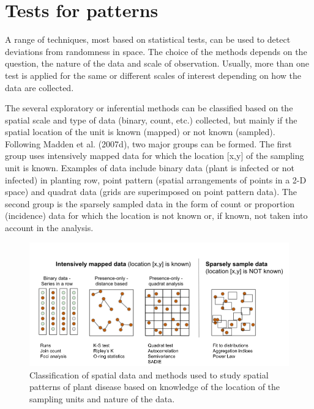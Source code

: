 \documentclass[
  letterpaper,
]{book}
\begin{document}
\hypertarget{tests-for-patterns}{%
\chapter{Tests for patterns}\label{tests-for-patterns}}

A range of techniques, most based on statistical tests, can be used to
detect deviations from randomness in space. The choice of the methods
depends on the question, the nature of the data and scale of
observation. Usually, more than one test is applied for the same or
different scales of interest depending on how the data are collected.

The several exploratory or inferential methods can be classified based
on the spatial scale and type of data (binary, count, etc.) collected,
but mainly if the spatial location of the unit is known (mapped) or not
known (sampled). Following Madden et al. (2007d), two major groups can
be formed. The first group uses intensively mapped data for which the
location {[}x,y{]} of the sampling unit is known. Examples of data
include binary data (plant is infected or not infected) in planting row,
point pattern (spatial arrangements of points in a 2-D space) and
quadrat data (grids are superimposed on point pattern data). The second
group is the sparsely sampled data in the form of count or proportion
(incidence) data for which the location is not known or, if known, not
taken into account in the analysis.

\begin{figure}

{\centering \includegraphics[width=6.76042in,height=\textheight]{imgs/spatial_methods2.png}

}

\caption{\label{fig-spatialmethods}Classification of spatial data and
methods used to study spatial patterns of plant disease based on
knowledge of the location of the sampling units and nature of the data.}

\end{figure}
\end{document}
